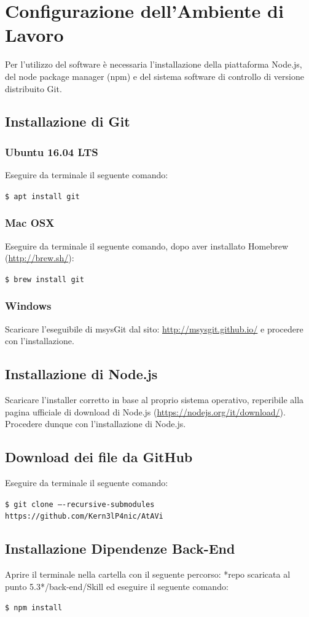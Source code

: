 \documentclass[../ManualeSviluppatore_v1.0.0.tex]{subfiles}
\begin{document}
\section{Configurazione dell'Ambiente di Lavoro}
	Per l'utilizzo del software è necessaria l'installazione della piattaforma Node.js, del node package manager (npm) e del sistema software di controllo di versione distribuito Git.
	\subsection{Installazione di Git}
		\subsubsection{Ubuntu 16.04 LTS}
			Eseguire da terminale il seguente comando:
				\begin{center}
					\texttt{\$ apt install git}
				\end{center}	
		\subsubsection{Mac OSX}
			Eseguire da terminale il seguente comando, dopo aver installato \gls{Homebrew} (\url{http://brew.sh/}):
				\begin{center}
					\texttt{\$ brew install git}
				\end{center}
		\subsubsection{Windows}
			Scaricare l'eseguibile di msysGit dal sito: \url{http://msysgit.github.io/} e procedere con l'installazione.
	\subsection{Installazione di Node.js}
		Scaricare l'installer corretto in base al proprio sistema operativo, reperibile alla pagina ufficiale di download di Node.js (\url{https://nodejs.org/it/download/}). Procedere dunque con l'installazione di Node.js.
	\subsection{Download dei file da GitHub}
		Eseguire da terminale il seguente comando:
			\begin{center}
				\texttt{\$ git clone ----recursive-submodules https://github.com/Kern3lP4nic/AtAVi}
			\end{center}
	\subsection{Installazione Dipendenze Back-End}
		Aprire il terminale nella cartella con il seguente percorso: *repo scaricata al punto 5.3*/back-end/Skill ed eseguire il seguente comando:
			\begin{center}
				\texttt{\$ npm install}
			\end{center}
\end{document}
